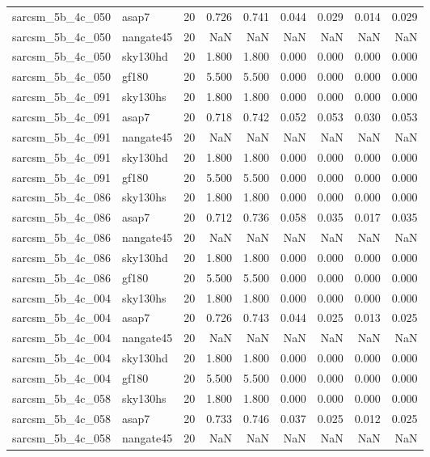 \begin{tabular}{llrrrrrrr}
sarcsm\_5b\_4c\_050 & asap7 & 20 & 0.726 & 0.741 & 0.044 & 0.029 & 0.014 & 0.029 \\
sarcsm\_5b\_4c\_050 & nangate45 & 20 & NaN & NaN & NaN & NaN & NaN & NaN \\
sarcsm\_5b\_4c\_050 & sky130hd & 20 & 1.800 & 1.800 & 0.000 & 0.000 & 0.000 & 0.000 \\
sarcsm\_5b\_4c\_050 & gf180 & 20 & 5.500 & 5.500 & 0.000 & 0.000 & 0.000 & 0.000 \\
sarcsm\_5b\_4c\_091 & sky130hs & 20 & 1.800 & 1.800 & 0.000 & 0.000 & 0.000 & 0.000 \\
sarcsm\_5b\_4c\_091 & asap7 & 20 & 0.718 & 0.742 & 0.052 & 0.053 & 0.030 & 0.053 \\
sarcsm\_5b\_4c\_091 & nangate45 & 20 & NaN & NaN & NaN & NaN & NaN & NaN \\
sarcsm\_5b\_4c\_091 & sky130hd & 20 & 1.800 & 1.800 & 0.000 & 0.000 & 0.000 & 0.000 \\
sarcsm\_5b\_4c\_091 & gf180 & 20 & 5.500 & 5.500 & 0.000 & 0.000 & 0.000 & 0.000 \\
sarcsm\_5b\_4c\_086 & sky130hs & 20 & 1.800 & 1.800 & 0.000 & 0.000 & 0.000 & 0.000 \\
sarcsm\_5b\_4c\_086 & asap7 & 20 & 0.712 & 0.736 & 0.058 & 0.035 & 0.017 & 0.035 \\
sarcsm\_5b\_4c\_086 & nangate45 & 20 & NaN & NaN & NaN & NaN & NaN & NaN \\
sarcsm\_5b\_4c\_086 & sky130hd & 20 & 1.800 & 1.800 & 0.000 & 0.000 & 0.000 & 0.000 \\
sarcsm\_5b\_4c\_086 & gf180 & 20 & 5.500 & 5.500 & 0.000 & 0.000 & 0.000 & 0.000 \\
sarcsm\_5b\_4c\_004 & sky130hs & 20 & 1.800 & 1.800 & 0.000 & 0.000 & 0.000 & 0.000 \\
sarcsm\_5b\_4c\_004 & asap7 & 20 & 0.726 & 0.743 & 0.044 & 0.025 & 0.013 & 0.025 \\
sarcsm\_5b\_4c\_004 & nangate45 & 20 & NaN & NaN & NaN & NaN & NaN & NaN \\
sarcsm\_5b\_4c\_004 & sky130hd & 20 & 1.800 & 1.800 & 0.000 & 0.000 & 0.000 & 0.000 \\
sarcsm\_5b\_4c\_004 & gf180 & 20 & 5.500 & 5.500 & 0.000 & 0.000 & 0.000 & 0.000 \\
sarcsm\_5b\_4c\_058 & sky130hs & 20 & 1.800 & 1.800 & 0.000 & 0.000 & 0.000 & 0.000 \\
sarcsm\_5b\_4c\_058 & asap7 & 20 & 0.733 & 0.746 & 0.037 & 0.025 & 0.012 & 0.025 \\
sarcsm\_5b\_4c\_058 & nangate45 & 20 & NaN & NaN & NaN & NaN & NaN & NaN \\

\end{tabular}
